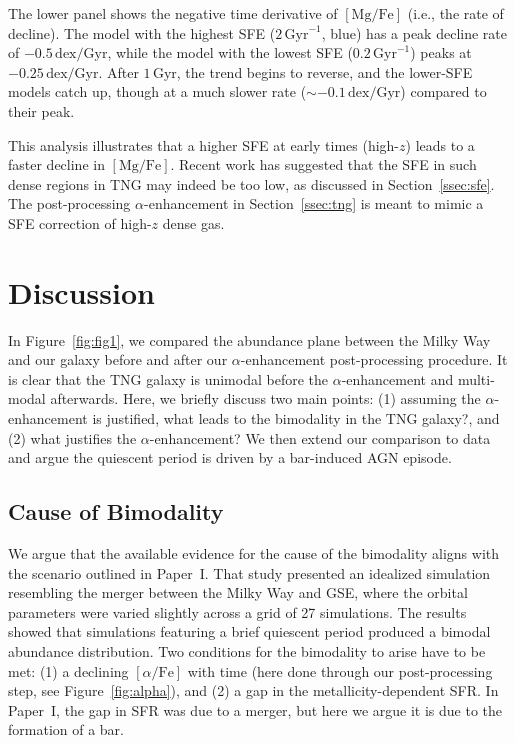 \documentclass[twocolumn]{aastex631}
\newcommand{\Gyr}{\ensuremath{\textrm{Gyr}}}
\newcommand{\MgFe}{\ensuremath{[\textrm{Mg}/\textrm{Fe}]}}
\newcommand{\alphaFe}{\ensuremath{[\alpha/\textrm{Fe}]}}
\newcommand{\dex}{\ensuremath{\textrm{dex}}}
\begin{document}
The lower panel shows the negative time derivative of \MgFe{} (i.e., the rate of decline). The model with the highest SFE ($2\,\Gyr^{-1}$, blue) has a peak decline rate of $-0.5\,\dex/\Gyr$, while the model with the lowest SFE ($0.2\,\Gyr^{-1}$) peaks at $-0.25\,\dex/\Gyr$. After $1\,\Gyr$, the trend begins to reverse, and the lower-SFE models catch up, though at a much slower rate ($\sim-0.1\,\dex/\Gyr$) compared to their peak.

This analysis illustrates that a higher SFE at early times (high-$z$) leads to a faster decline in \MgFe{}. Recent work has suggested that the SFE in such dense regions in TNG may indeed be too low, as discussed in Section~\ref{ssec:sfe}. The post-processing $\alpha$-enhancement in Section~\ref{ssec:tng} is meant to mimic a SFE correction of high-$z$ dense gas.

\section{Discussion}\label{sec:disc}
In Figure~\ref{fig:fig1}, we compared the abundance plane between the Milky Way and our galaxy before and after our $\alpha$-enhancement post-processing procedure. It is clear that the TNG galaxy is unimodal before the $\alpha$-enhancement and multi-modal afterwards. Here, we briefly discuss two main points: (1) assuming the $\alpha$-enhancement is justified, what leads to the bimodality in the TNG galaxy?, and (2) what justifies the $\alpha$-enhancement? We then extend our comparison to data and argue the quiescent period is driven by a bar-induced AGN episode.

\subsection{Cause of Bimodality}\label{ssec:bim_cause}
We argue that the available evidence for the cause of the bimodality aligns with the scenario outlined in Paper~I. That study presented an idealized simulation resembling the merger between the Milky Way and GSE, where the orbital parameters were varied slightly across a grid of 27 simulations. The results showed that simulations featuring a brief quiescent period produced a bimodal abundance distribution. Two conditions for the bimodality to arise have to be met: (1) a declining \alphaFe{} with time (here done through our post-processing step, see Figure~\ref{fig:alpha}), and (2) a gap in the metallicity-dependent SFR. In Paper~I, the gap in SFR was due to a merger, but here we argue it is due to the formation of a bar.
\end{document}
